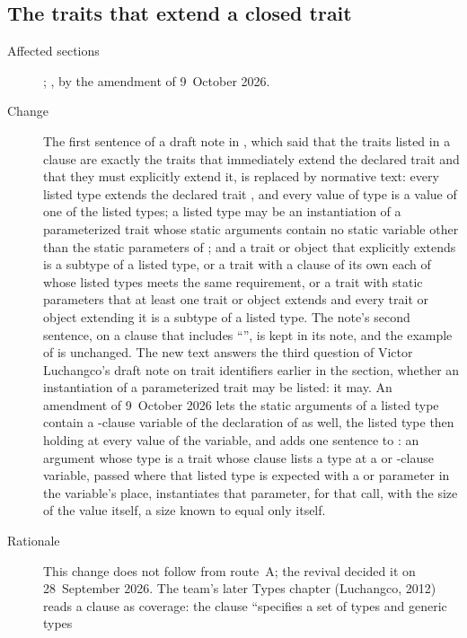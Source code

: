 \subsection{The traits that extend a closed trait}

\begin{description}
\item[Affected sections] ; , by the
amendment of 9~October 2026.
\item[Change] The first sentence of a draft note in ,
which said that the traits listed in a  clause are exactly
the traits that immediately extend the declared trait and that they must
explicitly extend it, is replaced by normative text: every listed type
extends the declared trait , and every value of type  is a
value of one of the listed types; a listed type may be an instantiation of
a parameterized trait whose static arguments contain no static variable
other than the static parameters of ; and a trait or object that explicitly extends
 is a subtype of a listed type, or a trait with a 
clause of its own each of whose listed types meets the same requirement, or
a trait with static parameters that at least one trait or object extends
and every trait or object extending it is a subtype of a listed type.
The note's second sentence, on a clause that includes ``\EXP{\ldots}'', is
kept in its note, and the example of  is unchanged.
The new text answers the third question of Victor Luchangco's draft note
on trait identifiers earlier in the section, whether an instantiation of a
parameterized trait may be listed: it may.
An amendment of 9~October 2026 lets the static arguments of a listed type
contain a -clause variable of the declaration of  as well,
the listed type then holding at every value of the variable, and adds one
sentence to : an argument whose type is a trait whose clause
lists a type at a  or  -clause variable, passed
where that listed type is expected with a  or  parameter in
the variable's place, instantiates that parameter, for that call, with the
size of the value itself, a size known to equal only itself.
\item[Rationale] This change does not follow from route~A; the revival
decided it on 28~September 2026.
The team's later Types chapter (Luchangco, 2012) reads a 
clause as coverage: the clause ``specifies a set of types and generic types

\end{description}
